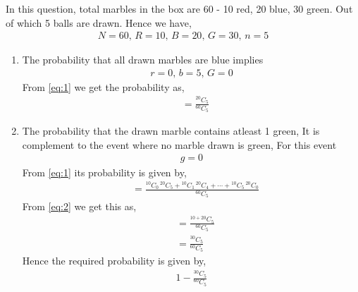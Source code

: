 \documentclass[journal,12pt,twocolumn]{IEEEtran}
\begin{document}
\begin{enumerate}
In this question, total marbles in the box are 60 - 10 red, 20 blue, 30 green. Out of which 5 balls are drawn. Hence we have,
\begin{align}
N = 60, \, R = 10, \,B = 20,  \, G = 30, \,n = 5
\end{align}
\begin{enumerate}
\item The probability that all drawn marbles are blue implies
\begin{align}
r = 0,\,  b = 5, \, G = 0
\end{align}
From \eqref{eq:1} we get the probability as,
\begin{align}
&= \frac{^{20}C_{5}}{^{60}C_{5}}
\end{align}
\item The probability that the drawn marble contains atleast 1 green, It is complement to the event where no marble drawn is green, For this event
\begin{align}
g = 0
\end{align}
From \eqref{eq:1} its probability is given by,
\begin{align}
&= \frac{{^{10}C_{0}} \, {^{20}C_{5}} + {^{10}C_{1}} \, {^{20}C_{4}} + \cdots + {^{10}C_{5}} \, {^{20}C_{0}}}{^{60}C_{5}}
\end{align}
From \eqref{eq:2} we get this as,
\begin{align}
&= \frac{^{10+20}C_{5}}{^{60}C_{5}}\\
&= \frac{^{30}C_{5}}{^{60}C_{5}}
\end{align}
Hence the required probability is given by,
\begin{align}
1 - \frac{^{30}C_{5}}{^{60}C_{5}}
\end{align}
\end{enumerate}
\end{enumerate}
\end{document}
